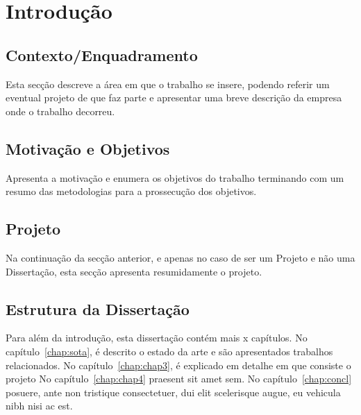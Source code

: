 
\chapter{Introdução} \label{chap:intro}



\section{Contexto/Enquadramento} \label{sec:context}

Esta secção descreve a área em que o trabalho se insere, podendo
referir um eventual projeto de que faz parte e apresentar uma breve
descrição da empresa onde o trabalho decorreu.

\lipsum[1]
\lipsum[1]

\section{Motivação e Objetivos} \label{sec:goals}

Apresenta a motivação e enumera os objetivos do trabalho terminando
com um resumo das metodologias para a prossecução dos objetivos.

\lipsum[1]
\lipsum[1]

\section{Projeto} \label{sec:proj}

Na continuação da secção anterior, e apenas no caso de ser um Projeto
e não uma Dissertação, esta secção apresenta resumidamente o projeto.

\lipsum[1]
\lipsum[1]

\section{Estrutura da Dissertação} \label{sec:struct}

Para além da introdução, esta dissertação contém mais x capítulos.
No capítulo~\ref{chap:sota}, é descrito o estado da arte e são
apresentados trabalhos relacionados.
No capítulo~\ref{chap:chap3}, é explicado em detalhe em que consiste o projeto
No capítulo~\ref{chap:chap4} praesent sit amet sem. 
No capítulo~\ref{chap:concl}  posuere, ante non tristique
consectetuer, dui elit scelerisque augue, eu vehicula nibh nisi ac
est. 
